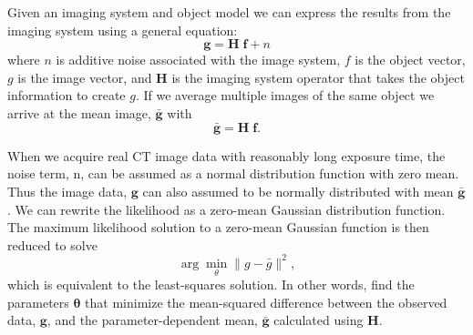Given an imaging system and object model we can express the results from the imaging system using a general equation:
\begin{equation}
\label{eq:gHf}
\mathbf{g} = \mathbf{H} \; \mathbf{f} + n
\end{equation}
where $n$ is additive noise associated with the image system, $f$ is the object vector, $g$ is the image vector, and $\mathbf{H}$ is the imaging system operator that takes the object information to create $g$.  If we average multiple images of the same object we arrive at the mean image, $\mathbf{\bar{g}}$ with
\begin{equation}
\label{eq:gbar}
\mathbf{\bar{g}} = \mathbf{H} \; \mathbf{f}.
\end{equation}

When we acquire real CT image data with reasonably long exposure time, the noise term, n, can be assumed as a normal distribution function with zero mean.  Thus the image data, $\mathbf{g}$ can also assumed to be normally distributed with mean $\mathbf{\bar{g}}$.  We can rewrite the likelihood as a zero-mean Gaussian distribution function.  The maximum likelihood solution to a zero-mean Gaussian function is then reduced to solve
\begin{equation}
\arg\min_{\theta} \| g - \bar{g} \|^2,
\label{eq:least_square}
\end{equation}
which is equivalent to the least-squares solution.  In other words, find the parameters $\boldsymbol{\theta}$ that minimize the mean-squared difference between the observed data, $\mathbf{g}$, and the parameter-dependent mean, $\mathbf{\bar{g}}$ calculated using $\mathbf{H}$.  

